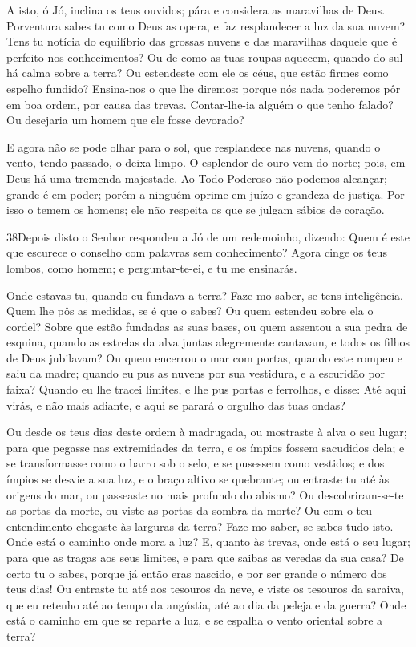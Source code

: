 A isto, ó Jó, inclina os teus ouvidos; pára e considera as
maravilhas de Deus. Porventura sabes tu como Deus as opera, e
faz resplandecer a luz da sua nuvem? Tens tu notícia do
equilíbrio das grossas nuvens e das maravilhas daquele que é
perfeito nos conhecimentos? Ou de como as tuas roupas
aquecem, quando do sul há calma sobre a terra? Ou estendeste
com ele os céus, que estão firmes como espelho fundido?
Ensina-nos o que lhe diremos: porque nós nada poderemos pôr
em boa ordem, por causa das trevas. Contar-lhe-ia alguém o
que tenho falado? Ou desejaria um homem que ele fosse devorado?

E agora não se pode olhar para o sol, que resplandece nas nuvens,
quando o vento, tendo passado, o deixa limpo. O esplendor de
ouro vem do norte; pois, em Deus há uma tremenda majestade.
Ao Todo-Poderoso não podemos alcançar; grande é em poder;
porém a ninguém oprime em juízo e grandeza de justiça. Por
isso o temem os homens; ele não respeita os que se julgam sábios de
coração.

\medskip

\lettrine{38} Depois disto o Senhor respondeu a Jó de um
redemoinho, dizendo: Quem é este que escurece o conselho com
palavras sem conhecimento? Agora cinge os teus lombos, como
homem; e perguntar-te-ei, e tu me ensinarás.

Onde estavas tu, quando eu fundava a terra? Faze-mo saber, se tens
inteligência. Quem lhe pôs as medidas, se é que o sabes? Ou quem
estendeu sobre ela o cordel? Sobre que estão fundadas as suas
bases, ou quem assentou a sua pedra de esquina, quando as
estrelas da alva juntas alegremente cantavam, e todos os filhos de
Deus jubilavam? Ou quem encerrou o mar com portas, quando este
rompeu e saiu da madre; quando eu pus as nuvens por sua
vestidura, e a escuridão por faixa? Quando eu lhe tracei
limites, e lhe pus portas e ferrolhos, e disse: Até aqui
virás, e não mais adiante, e aqui se parará o orgulho das tuas
ondas?

Ou desde os teus dias deste ordem à madrugada, ou mostraste à
alva o seu lugar; para que pegasse nas extremidades da terra,
e os ímpios fossem sacudidos dela; e se transformasse como o
barro sob o selo, e se pusessem como vestidos; e dos ímpios
se desvie a sua luz, e o braço altivo se quebrante; ou
entraste tu até às origens do mar, ou passeaste no mais profundo do
abismo? Ou descobriram-se-te as portas da morte, ou viste as
portas da sombra da morte? Ou com o teu entendimento chegaste
às larguras da terra? Faze-mo saber, se sabes tudo isto. Onde
está o caminho onde mora a luz? E, quanto às trevas, onde está o seu
lugar; para que as tragas aos seus limites, e para que saibas
as veredas da sua casa? De certo tu o sabes, porque já então
eras nascido, e por ser grande o número dos teus dias! Ou
entraste tu até aos tesouros da neve, e viste os tesouros da
saraiva, que eu retenho até ao tempo da angústia, até ao dia
da peleja e da guerra? Onde está o caminho em que se reparte
a luz, e se espalha o vento oriental sobre a terra?

